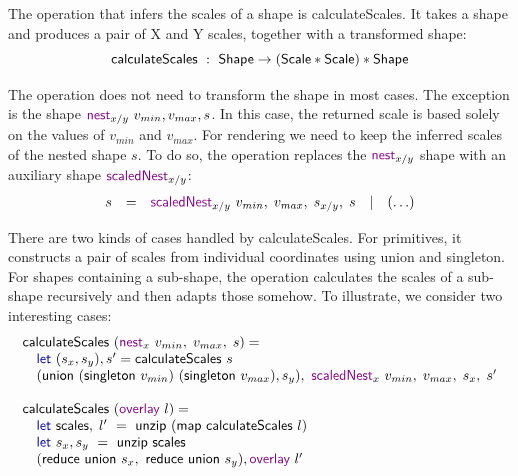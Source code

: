 \documentclass{jfp}
\newcommand{\ident}[1]{\textnormal{\textcolor{idclr}{\sffamily #1}}}
\newcommand{\kvd}[1]{\textnormal{\textcolor{kvdclr}{\sffamily #1}}}
\newcommand{\fkvd}[1]{\textnormal{\textcolor{fkvdclr}{\sffamily #1}}}
\begin{document}
The operation that infers the scales of a shape is \ident{calculateScales}. It takes a shape
and produces a pair of X and Y scales, together with a transformed shape:
%
\begin{equation*}
  \ident{calculateScales} ~:~ \ident{Shape} \rightarrow (\ident{Scale}*\ident{Scale}) * \ident{Shape}
\end{equation*}

\vspace{-1em}
\noindent
The operation does not need to transform the shape in most cases. The exception is the
shape $\kvd{nest}_{x/y}~v_{min}, v_{max}, s$. In this case, the returned scale is based solely on the
values of $v_{min}$ and $v_{max}$. For rendering we need to keep the inferred scales of the nested
shape $s$. To do so, the operation replaces the $\kvd{nest}_{x/y}$ shape with an auxiliary shape
$\kvd{scaledNest}_{x/y}$:
%
\begin{equation*}
\begin{array}{rclcl}
s &=& \kvd{scaledNest}_{x/y}~v_{min},\;v_{max},\;s_{x/y},\;s &|& (\ldots)
\end{array}
\end{equation*}

\vspace{-1em}
\noindent
There are two kinds of cases handled by \ident{calculateScales}. For primitives, it constructs
a pair of scales from individual coordinates using \ident{union} and \ident{singleton}. For
shapes containing a sub-shape, the operation calculates the scales of a sub-shape recursively
and then adapts those somehow. To illustrate, we consider two interesting cases:
%
\begin{equation*}
\begin{array}{l}
\ident{calculateScales}~(\kvd{nest}_x~v_{min},\;v_{max},\;s) = \\
\quad\fkvd{let}~(s_x, s_y),s' = \ident{calculateScales}~s\\
\quad(\ident{union}~(\ident{singleton}~v_{min})~(\ident{singleton}~v_{max}), s_y),~\kvd{scaledNest}_x~v_{min},\;v_{max},\;s_x,\;s'\\
\\
\ident{calculateScales}~(\kvd{overlay}~l) = \\
\quad\fkvd{let}~\ident{scales},\;l'~=~\ident{unzip}~(\ident{map}~\ident{calculateScales}~l)\\
\quad\fkvd{let}~s_x,s_y~=~\ident{unzip}~\ident{scales}\\
\quad(\ident{reduce}~\ident{union}~s_x,~\ident{reduce}~\ident{union}~s_y), \kvd{overlay}~l'
\end{array}
\end{equation*}
\end{document}

